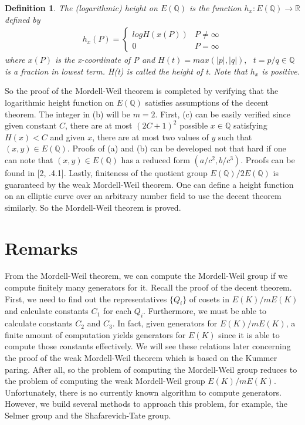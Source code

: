 \documentclass[12pt]{article}
\newcommand{\<}{\langle}
\renewcommand{\>}{\rangle}
\numberwithin{equation}{section}
\theoremstyle{plain}
\newtheorem{defn}[thm]{Definition}
\theoremstyle{definition}
\begin{document}
\begin{defn} The (logarithmic) height on \(E(\mathbb{Q})\) is the function \(h_x : E(\mathbb{Q}) \rightarrow \mathbb{R}\) defined by 
    \begin{align*}
        h_x(P) =  \begin{cases} 
                        logH(x(P)) & P \ne \infty \\
                        0 & P = \infty 
                   \end{cases}
    \end{align*}
    where \( x(P) \) is the x-coordinate of P and \(H(t) = max( \lvert p \rvert , \lvert q \rvert), \text{ } t=p/q \in \mathbb{Q}\) is a fraction in lowest term. H(t) is called the height of t. Note that \(h_x\) is positive.
\end{defn}
So the proof of the Mordell-Weil theorem is completed by verifying that the logarithmic height function on \(E(\mathbb{Q})\) satisfies assumptions of the decent theorem. The integer in (b) will be \(m=2\). First, (c) can be easily verified since given constant \(C\), there are at most \((2C+1)^2\) possible \( x\in \mathbb{Q}\) satisfying \( H(x) < C \) and given \(x\), there are at most two values of \(y\) such that \( (x,y) \in E(\mathbb{Q})\). Proofs of (a) and (b) can be developed not that hard if one can note that \( (x,y) \in E(\mathbb{Q}) \) has a reduced form \((a/c^2, b/c^3)\). Proofs can be found in [2, .4.1]. Lastly, finiteness of the quotient group \(E(\mathbb{Q})/2E(\mathbb{Q})\) is guaranteed by the weak Mordell-Weil theorem. One can define a height function on an elliptic curve over an arbitrary number field to use the decent theorem similarly. So the Mordell-Weil theorem is proved.

\section{Remarks}
    From the Mordell-Weil theorem, we can compute the Mordell-Weil group if we compute finitely many generators for it. Recall the proof of the decent theorem. First, we need to find out the representatives \(\{Q_i\}\) of cosets in \( E(K)/mE(K)\) and calculate constants \(C_1\) for each \(Q_i\). Furthermore, we must be able to calculate constants \(C_2\) and \(C_3\). In fact, given generators for \( E(K)/mE(K) \), a finite amount of computation yields generators for \( E(K)\) since it is able to compute those constants effectively. We will see these relations later concerning the proof of the weak Mordell-Weil theorem which is based on the Kummer paring. After all, so the problem of computing the Mordell-Weil group reduces to the problem of computing the weak Mordell-Weil group \(E(K)/mE(K)\). Unfortunately, there is no currently known algorithm to compute generators. However, we build several methods to approach this problem, for example, the Selmer group and the Shafarevich-Tate group.
\end{document}

